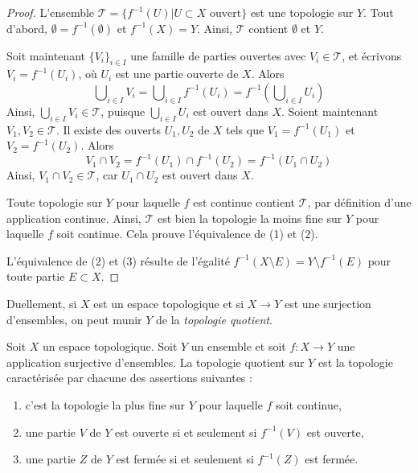 \begin{proof}
L'ensemble $\mathcal{T} = \{f^{-1}(U) | U \subset X \text{ ouvert}\}$ est
une topologie sur $Y$. Tout d'abord,
$\emptyset = f^{-1}(\emptyset)$ et $f^{-1}(X) = Y$.
Ainsi, $\mathcal{T}$ contient $\emptyset$ et $Y$.

\medskip\noindent
Soit maintenant $\{V_i\}_{i \in I}$ une famille de parties ouvertes avec
$V_i \in \mathcal{T}$, et écrivons $V_i = f^{-1}(U_i)$, où $U_i$ est une
partie ouverte de $X$. Alors
$$
\bigcup\nolimits_{i\in I} V_i =
\bigcup\nolimits_{i\in I} f^{-1}(U_i) =
f^{-1}\left(\bigcup\nolimits_{i\in I} U_i\right)
$$
Ainsi, $\bigcup_{i\in I} V_i \in \mathcal{T}$, puisque
$\bigcup_{i\in I} U_i$ est ouvert dans $X$.
Soient maintenant $V_1, V_2 \in \mathcal{T}$. Il existe des ouverts
$U_1, U_2$ de $X$ tels que $V_1 = f^{-1}(U_1)$ et
$V_2 = f^{-1}(U_2)$. Alors
$$
V_1 \cap V_2 = f^{-1}(U_1) \cap f^{-1}(U_2) = f^{-1}(U_1 \cap U_2)
$$
Ainsi, $V_1 \cap V_2 \in \mathcal{T}$, car $U_1 \cap U_2$ est ouvert dans
$X$.

\medskip\noindent
Toute topologie sur $Y$ pour laquelle $f$ est continue contient
$\mathcal{T}$, par définition d'une application continue. Ainsi,
$\mathcal{T}$ est bien la topologie la moins fine sur $Y$ pour laquelle $f$
soit continue. Cela prouve l'équivalence de (1) et (2).

\medskip\noindent
L'équivalence de (2) et (3) résulte de l'égalité
$f^{-1}(X \setminus E) = Y \setminus f^{-1}(E)$ pour toute partie
$E \subset X$.
\end{proof}

\noindent
Duellement, si $X$ est un espace topologique et si $X \to Y$ est une
surjection d'ensembles, on peut munir $Y$ de la {\it topologie quotient}.

\begin{lemma}
\label{lemma-quotient}
Soit $X$ un espace topologique. Soit $Y$ un ensemble et soit $f : X \to Y$
une application surjective d'ensembles. La topologie quotient sur $Y$ est la
topologie caractérisée par chacune des assertions suivantes :
\begin{enumerate}
\item c'est la topologie la plus fine sur $Y$ pour laquelle $f$ soit continue,
\item une partie $V$ de $Y$ est ouverte si et seulement si $f^{-1}(V)$ est
ouverte,
\item une partie $Z$ de $Y$ est fermée si et seulement si $f^{-1}(Z)$ est
fermée.
\end{enumerate}
\end{lemma}

